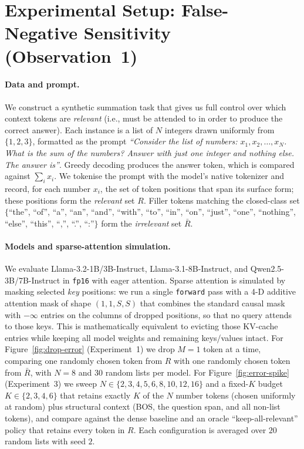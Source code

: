 \section{Experimental Setup: False-Negative Sensitivity (Observation~1)}
\label{app:false-negativity}

\paragraph{Data and prompt.}
We construct a synthetic summation task that gives us full control over which
context tokens are \emph{relevant} (i.e., must be attended to in order to
produce the correct answer). Each instance is a list of $N$ integers drawn
uniformly from $\{1,2,3\}$, formatted as the prompt
\textit{``Consider the list of numbers: $x_1, x_2, \ldots, x_N$. What is the
sum of the numbers? Answer with just one integer and nothing else. The answer
is''}. Greedy decoding produces the answer token, which is compared against
$\sum_i x_i$. We tokenise the prompt with the model's native tokenizer and
record, for each number $x_i$, the set of token positions that span its
surface form; these positions form the \emph{relevant} set $R$. Filler tokens
matching the closed-class set $\{$``the'', ``of'', ``a'', ``an'', ``and'',
``with'', ``to'', ``in'', ``on'', ``just'', ``one'', ``nothing'', ``else'',
``this'', ``,'', ``.'', ``:''$\}$ form the \emph{irrelevant} set $\bar R$.

\paragraph{Models and sparse-attention simulation.}
We evaluate Llama-3.2-1B/3B-Instruct, Llama-3.1-8B-Instruct, and
Qwen2.5-3B/7B-Instruct in \texttt{fp16} with eager attention. Sparse attention
is simulated by masking selected \emph{key} positions: we run a single
\texttt{forward} pass with a 4-D additive attention mask of shape
$(1,1,S,S)$ that combines the standard causal mask with $-\infty$ entries on
the columns of dropped positions, so that no query attends to those keys. This
is mathematically equivalent to evicting those KV-cache entries while keeping
all model weights and remaining keys/values intact. For Figure~\ref{fig:drop-error}
(Experiment~1) we drop $M{=}1$ token at a time, comparing one randomly chosen
token from $R$ with one randomly chosen token from $\bar R$, with $N{=}8$ and
$30$ random lists per model. For Figure~\ref{fig:error-spike} (Experiment~3)
we sweep $N\in\{2,3,4,5,6,8,10,12,16\}$ and a fixed-$K$ budget
$K\in\{2,3,4,6\}$ that retains exactly $K$ of the $N$ number tokens (chosen
uniformly at random) plus structural context (BOS, the question span, and all
non-list tokens), and compare against the dense baseline and an
oracle ``keep-all-relevant'' policy that retains every token in $R$. Each
configuration is averaged over $20$ random lists with seed $2$.

